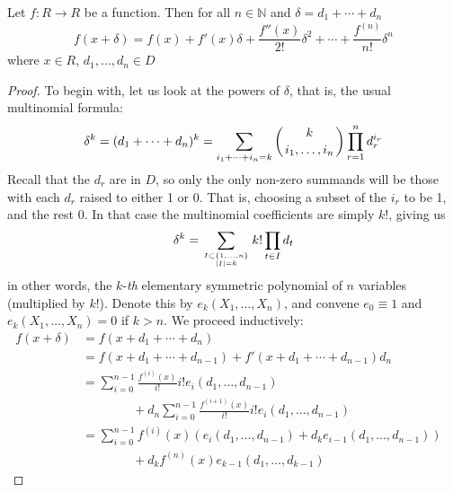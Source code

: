 \begin{proposition}
  Let \( f:R\to R \) be a function. Then for all \( n\in\mathbb N \) and \( \delta = d_1+\cdots+d_n \)
  \begin{equation*}
    f(x+\delta) = f(x) + f'(x)\delta + \frac{f''(x)}{2!}\delta^2 + \cdots + \frac{f^{(n)}}{n!}\delta^n
  \end{equation*}
  where \( x\in R \), \( d_1,\dots,d_n\in D \)
\end{proposition}

\begin{proof}
  To begin with, let us look at the powers of \( \delta \), that is, the usual multinomial formula:
  \begin{equation*}
    \delta^k = (d_1+\cdots+d_n)^k = \sum_{i_1+\cdots+i_n=k}\left( k\atop i_1,\dots,i_n \right)\prod_{r=1}^{n}d_r^{i_r}
  \end{equation*}
  Recall that the \( d_r \) are in \( D \), so only the only non-zero summands will be those with each \( d_r \) raised to either 1 or 0. That is, choosing a subset of the \( i_r \) to be 1, and the rest 0. In that case the multinomial coefficients are simply \( k! \), giving us
  \begin{equation*}
    \delta^k = \sum_{I\subset \{1,\dots,n\}\atop \lvert I \rvert=k}k!\prod_{t\in I}d_t
  \end{equation*}
  in other words, the \( k \)-\textit{th} elementary symmetric polynomial of \( n \) variables (multiplied by \( k! \)). Denote this by \( e_k(X_1,\dots,X_n) \), and convene \( e_0 \equiv 1 \) and \( e_k(X_1,\dots,X_n) = 0 \) if \( k>n \). We proceed inductively:
  \begin{equation}
    \begin{aligned}
      f(x+\delta) & = f(x+d_1+\cdots+d_n) & \\[10pt]
                  & = f(x+d_1+\cdots+d_{n-1})+f'(x+d_1+\cdots+d_{n-1})d_n & \\[10pt]
                  & = \sum_{i=0}^{n-1}\frac{f^{(i)}(x)}{i!}i!e_i(d_1,\dots,d_{n-1}) & \\[10pt]
                  &\qquad\qquad + d_n\sum_{i=0}^{n-1}\frac{f^{(i+1)}(x)}{i!}i!e_i(d_1,\dots,d_{n-1}) & \\[10pt]
                  & = \sum_{i=0}^{n-1}f^{(i)}(x)\left( e_i(d_1,\dots,d_{n-1})+d_ke_{i-1}(d_1,\dots,d_{n-1})\right) & \\[10pt]
                  &\qquad\qquad + d_kf^{(n)}(x)e_{k-1}(d_1,\dots,d_{k-1}) &
    \end{aligned}

\end{equation}
\end{proof}
